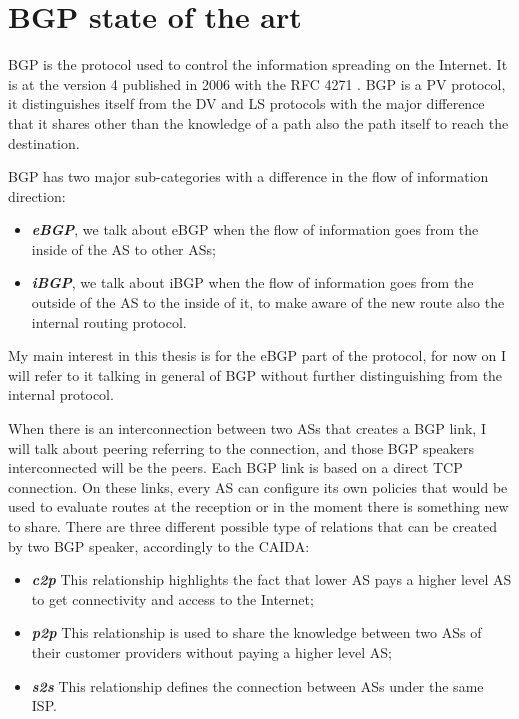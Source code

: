 \chapter{BGP state of the art}
\label{cha:bgp_art}

\ac{BGP} is the protocol used to control the information spreading on the Internet.
It is at the version \num{4} published in \num{2006} with the \ac{RFC} \num{4271}
\cite{rfc4271}.
\ac{BGP} is a \ac{PV} protocol, it distinguishes itself from the \ac{DV} and \ac{LS}
protocols with the major difference that it shares other than the knowledge of
a path also the path itself to reach the destination.

\ac{BGP} has two major sub-categories with a difference in the flow of information
direction:
\begin{itemize}
	\item \textbf{\textit{\ac{eBGP}}}, we talk about \ac{eBGP} when the
		flow of information goes from the inside
		of the \ac{AS} to other \acp{AS};
	\item \textbf{\textit{\ac{iBGP}}}, we talk about \ac{iBGP} when the flow
		of information goes from the outside of the \ac{AS} to the inside of
		it, to make aware of the new route also the internal routing protocol.
\end{itemize}

My main interest in this thesis is for the \ac{eBGP} part of the protocol, for
now on I will refer to it talking in general of \ac{BGP} without further distinguishing
from the internal protocol.

When there is an interconnection between two \acp{AS} that creates a \ac{BGP}
link, I will talk about peering referring to the connection, and those \ac{BGP}
speakers interconnected will be the peers.
Each \ac{BGP} link is based on a direct \ac{TCP} connection.
On these links, every \ac{AS} can configure its own policies that would be used
to evaluate routes at the reception or in the moment there is something new
to share.
There are three different possible type of relations that can be created by two
\ac{BGP} speaker, accordingly to the \ac{CAIDA}:

\begin{itemize}
	\item \textbf{\textit{\ac{c2p}}} This relationship highlights the fact that
		lower \ac{AS} pays a higher level \ac{AS} to get connectivity and access
		to the Internet;
	\item \textbf{\textit{\ac{p2p}}} This relationship is used to share the knowledge
		between two \acp{AS} of their customer providers without paying a higher
		level \ac{AS};
	\item \textbf{\textit{\ac{s2s}}} This relationship defines the connection
		between \acp{AS} under the same \ac{ISP}.
\end{itemize}

